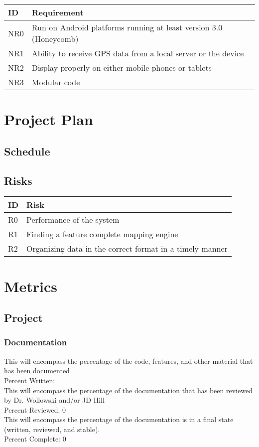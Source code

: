 \documentclass{article}
\begin{document}
\begin{tabular}{ | p{.5in} | p{5in} | }
\hline
\textbf{ID} & \textbf{Requirement}\\
\hline
\hline
NR0 & Run on Android platforms running at least version 3.0 (Honeycomb)\\
\hline
NR1 & Ability to receive GPS data from a local server or the device\\
\hline
NR2 & Display properly on either mobile phones or tablets\\
\hline
NR3 & Modular code\\
\hline
\end{tabular}

\section{Project Plan}
\subsection{Schedule}
\subsection{Risks}

\begin{tabular}{ | p{.5in} | p{4.5in} | }
\hline
\textbf{ID} & \textbf{Risk}\\
\hline
\hline
R0 & Performance of the system\\
\hline
R1 & Finding a feature complete mapping engine\\
\hline
R2 & Organizing data in the correct format in a timely manner\\
\hline
\end{tabular}

\section{Metrics}
\subsection{Project}
\subsubsection{Documentation}
This will encompass the percentage of the code, features, and other material that has been documented\\
Percent Written:	\\
This will encompass the percentage of the documentation that has been reviewed by Dr. Wollowski and/or JD Hill\\
Percent Reviewed:	0\\
This will encompass the percentage of the documentation is in a final state (written, reviewed, and stable).\\
Percent Complete:	0\\
\end{document}
